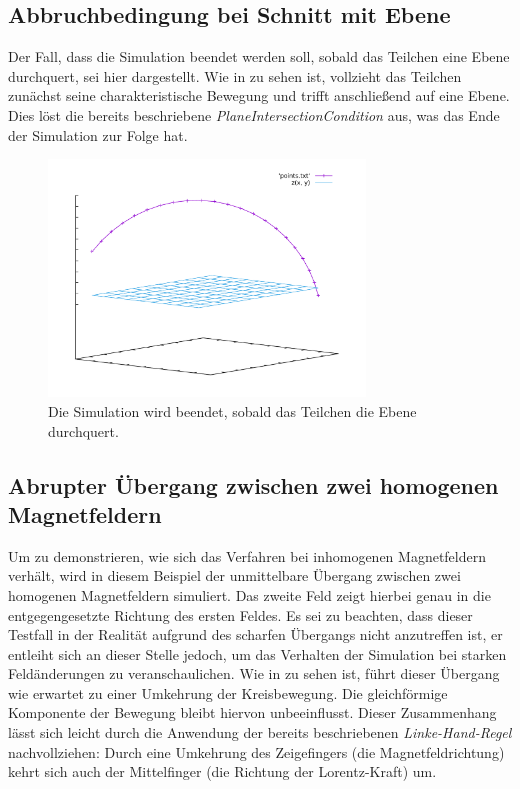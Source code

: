 \subsection{Abbruchbedingung bei Schnitt mit Ebene}

Der Fall, dass die Simulation beendet werden soll, sobald das Teilchen eine Ebene durchquert, sei hier dargestellt. Wie in
 zu sehen ist, vollzieht das Teilchen zun\"achst seine charakteristische Bewegung und trifft anschlie{\ss}end
auf eine Ebene. Dies l\"ost die bereits beschriebene \textit{PlaneIntersectionCondition} aus, was das Ende der Simulation zur Folge
hat.

\begin{figure}[h]
  \centering
  \includegraphics[width=0.75\textwidth]{../gnuplot/stop_plane}
  \caption{Die Simulation wird beendet, sobald das Teilchen die Ebene durchquert.}
  \label{fig:stop_plane}
\end{figure}

\subsection{Abrupter \"Ubergang zwischen zwei homogenen Magnetfeldern}

Um zu demonstrieren, wie sich das Verfahren bei inhomogenen Magnetfeldern verh\"alt, wird in diesem Beispiel der unmittelbare
\"Ubergang zwischen zwei homogenen Magnetfeldern simuliert. Das zweite Feld zeigt hierbei genau in die entgegengesetzte Richtung
des ersten Feldes. Es sei zu beachten, dass dieser Testfall in der Realit\"at aufgrund des scharfen \"Ubergangs nicht anzutreffen ist,
er entleiht sich an dieser Stelle jedoch, um das Verhalten der Simulation bei starken Feld\"anderungen zu veranschaulichen.
Wie in  zu sehen ist, f\"uhrt dieser \"Ubergang wie erwartet zu einer Umkehrung der
Kreisbewegung. Die gleichf\"ormige Komponente der Bewegung bleibt hiervon unbeeinflusst. Dieser Zusammenhang l\"asst sich leicht
durch die Anwendung der bereits beschriebenen \textit{Linke-Hand-Regel} nachvollziehen: Durch eine Umkehrung des Zeigefingers
(die Magnetfeldrichtung) kehrt sich auch der Mittelfinger (die Richtung der Lorentz-Kraft) um.


